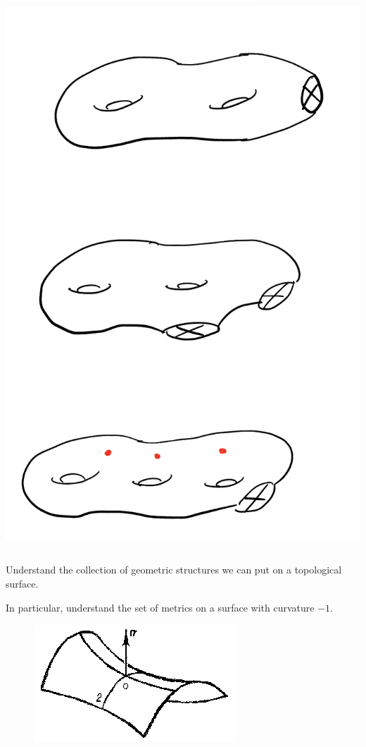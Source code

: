 \begin{frame}
\begin{columns}
\begin{column}{0.5\textwidth}
\begin{center}
      \includegraphics[scale=0.15]{nonorientable.png}
     \end{center}
\end{column}
\end{columns}
\end{frame}

\begin{frame}
  \begin{goal}
    Understand the collection of geometric structures we can put on a topological surface.
  \end{goal}
  \pause
  In particular, understand the set of metrics on a surface with curvature $-1$.
  \begin{figure}[h]
    \centering
    \includegraphics[scale=0.5]{negative-curvature.png}
  \end{figure}
\end{frame}

